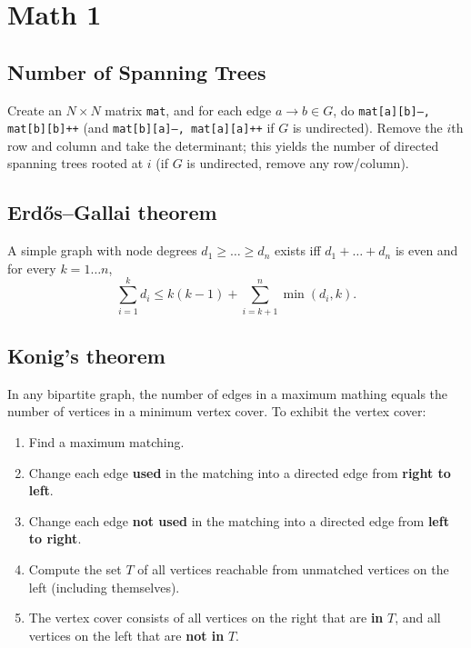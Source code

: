 \section{Math 1}
	\subsection{Number of Spanning Trees}
		Create an $N\times N$ matrix \texttt{mat}, and for each edge $a \rightarrow b \in G$, do
		\texttt{mat[a][b]--, mat[b][b]++} (and \texttt{mat[b][a]--, mat[a][a]++} if $G$ is undirected).
		Remove the $i$th row and column and take the determinant; this yields the number of directed spanning trees rooted at $i$
		(if $G$ is undirected, remove any row/column).

	\subsection{Erdős–Gallai theorem}
		A simple graph with node degrees $d_1 \ge \dots \ge d_n$ exists iff $d_1 + \dots + d_n$ is even and for every $k = 1\dots n$,
		\[ \sum _{i=1}^{k}d_{i}\leq k(k-1)+\sum _{i=k+1}^{n}\min(d_{i},k). \]

	\subsection{Konig's theorem}
  In any bipartite graph, the number of edges in a maximum mathing equals the number of vertices in a minimum vertex cover. To exhibit the vertex cover:\\
  \begin{enumerate}
  \item
  Find a maximum matching.
  \item
  Change each edge {\bf used} in the matching into a directed edge from {\bf right to left}.
  \item
  Change each edge {\bf not used} in the matching into a directed edge from {\bf left to right}.
  \item
  Compute the set $T$ of all vertices reachable from unmatched vertices on the left (including themselves).
  \item
  The vertex cover consists of all vertices on the right that are {\bf in} $T$, and all vertices on the left
  that are {\bf not in} $T$.
  \end{enumerate}

